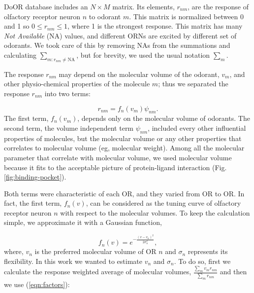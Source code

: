 \documentclass[fleqn,10pt]{wlscirep} %
\begin{document}
DoOR database includes an $N\times M$ matrix. 
Its elements, $r_{nm}$, are the response of olfactory receptor neuron $n$ to odorant $m$. 
This matrix is normalized between 0 and 1 so $0 \le r_{nm} \le 1$, where 1 is the strongest response.
This matrix has many {\it Not Available} (NA) values, 
and different ORNs are excited by different set of odorants. 
We took care of this by removing NAs from the summations and calculating $\sum_{m: r_{nm} \neq \text{NA}}$, 
but for brevity, we used the usual notation $\sum_m$.

The response $r_{nm}$ may depend on the molecular volume of the odorant, $v_m$, 
and other physio-chemical properties of the molecule $m$; 
thus we separated the response $r_{nm}$ into two terms:

\begin{equation}
	r_{nm} = f_n(v_m) \psi_{nm}.
	\label{eqn:factors}
\end{equation}
The first term, $f_n(v_m)$, depends only on the molecular volume of odorants.
The second term, the volume independent term $\psi_{nm}$, included every other influential properties of molecules, 
but the molecular volume or any other properties that correlates to molecular volume (eg, molecular weight).
Among all the molecular parameter that correlate with molecular volume, 
we used molecular volume because it fits to the acceptable picture of protein-ligand interaction (Fig. \ref{fig:binding-pocket}).

Both terms were characteristic of each OR, and they varied from OR to OR.
In fact, the first term, $f_n(v)$, can be considered as the tuning curve of olfactory receptor neuron $n$ with respect to the molecular volumes. 
To keep the calculation simple, we approximate it with a Gaussian function,  

\begin{equation}
	\displaystyle f_n(v) = e^{-\frac{(v-v_n)^2}{2\sigma^2_n}}, 
	\label{eqn:volume-dependence}
\end{equation}
where, $v_n$ is the preferred molecular volume of OR $n$ and $\sigma_n$ represents its flexibility. 
In this work we wanted to estimate $v_n$ and $\sigma_n$. 
To do so, first we calculate the response weighted average of molecular volumes, 
$\frac{\sum_{m} v_m r_{nm}}{\sum_{m} r_{nm}}$ and then we use (\ref{eqn:factors}):
\end{document}
